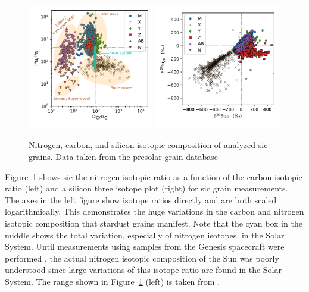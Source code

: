 \begin{figure}[tb]
    \centering
    \includegraphics[width=0.49\textwidth]{graphics/stardust/sic_n_c_all}
    \includegraphics[width=0.49\textwidth]{graphics/stardust/sic_si_3iso_all}
    \caption{Nitrogen, carbon, and silicon isotopic composition of analyzed \ac{sic} grains. Data taken from the presolar grain database}
    \label{fig:stardust:classification_c_n_si_data}
\end{figure}
Figure~\ref{fig:stardust:classification_c_n_si_data} shows \ac{sic} the nitrogen isotopic ratio as a function of the carbon isotopic ratio (left) and a silicon three isotope plot (right) for \ac{sic} grain measurements. The axes in the left figure show isotope ratios directly and are both scaled logarithmically. This demonstrates the huge variations in the carbon and nitrogen isotopic composition that stardust grains manifest. Note that the cyan box in the middle shows the total variation, especially of nitrogen isotopes, in the Solar System. Until measurements using samples from the Genesis spacecraft were performed \citep{marty11}, the actual nitrogen isotopic composition of the Sun was poorly understood since large variations of this isotope ratio are found in the Solar System. The range shown in Figure~\ref{fig:stardust:classification_c_n_si_data} (left) is taken from \citet{fueri15}. 

